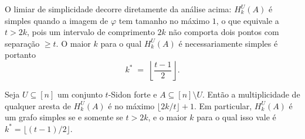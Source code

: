 \documentclass[reqno,a4paper,12pt]{amsart}
\begin{document}
O limiar de simplicidade decorre diretamente da análise acima: $H_k^U(A)$ é simples quando
a imagem de $\varphi$ tem tamanho no máximo $1$, o que equivale a $t > 2k$, pois um intervalo
de comprimento $2k$ não comporta dois pontos com separação $\geq t$. O maior $k$ para o qual
$H_k^U(A)$ é necessariamente simples é portanto
\[
  k^* \;=\; \left\lfloor \frac{t-1}{2} \right\rfloor.
\]

\begin{proposition}\label{prop:multiplicidade}
  Seja $U \subseteq [n]$ um conjunto $t$-Sidon forte e $A \subseteq [n] \setminus U$. Então a
  multiplicidade de qualquer aresta de $H_k^U(A)$ é no máximo $\lfloor 2k/t \rfloor + 1$.
  Em particular, $H_k^U(A)$ é um grafo simples se e somente se $t > 2k$, e o maior $k$ para
  o qual isso vale é $k^* = \lfloor (t-1)/2 \rfloor$.
\end{proposition}
\end{document}
